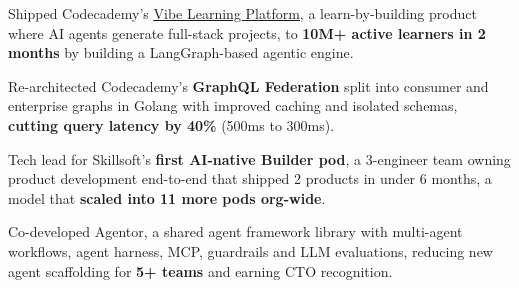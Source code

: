 \documentclass[letterpaper,11pt]{article}
\newcommand{\resumeItem}[1]{
  \item\small{
    {#1 \vspace{.8pt}}
  }
}
\begin{document}



        \resumeItem{\normalsize{Shipped Codecademy's \href{https://www.codecademy.com/resources/blog/why-the-future-of-learning-starts-with-building}{\underline{Vibe Learning Platform}}, a learn-by-building product where AI agents generate full-stack projects, to \textbf{10M+ active learners in 2 months} by building a LangGraph-based agentic engine.}}

        \resumeItem{\normalsize{Re-architected Codecademy's \textbf{GraphQL Federation} split into consumer and enterprise graphs in Golang with improved caching and isolated schemas, \textbf{cutting query latency by 40\%} (500ms to 300ms).}}

        \resumeItem{\normalsize{Tech lead for Skillsoft's \textbf{first AI-native Builder pod}, a 3-engineer team owning product development
end-to-end that shipped 2 products in under 6 months, a model that \textbf{scaled into 11 more pods org-wide}.}}

        \resumeItem{\normalsize{Co-developed Agentor, a shared agent framework library with multi-agent workflows, agent harness, MCP, guardrails and LLM evaluations, reducing new agent scaffolding for \textbf{5+ teams} and earning CTO recognition.}}


\end{document}

